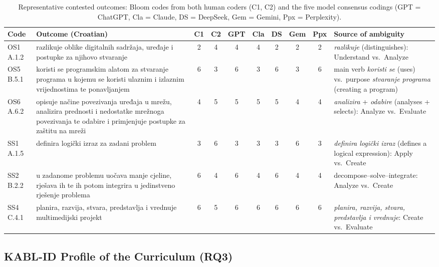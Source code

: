 \documentclass[journal,article,submit,pdftex,moreauthors]{Definitions/mdpi}
\begin{document}
\begin{table}[H]
\caption{Representative contested outcomes: Bloom codes from both human coders (C1, C2) and the five model consensus codings (GPT = ChatGPT, Cla = Claude, DS = DeepSeek, Gem = Gemini, Ppx = Perplexity).}
\label{tab:contested}
\centering
\scriptsize
\setlength{\tabcolsep}{2.5pt}
\begin{tabularx}{\linewidth}{lp{4.2cm}ccccccc>{\raggedright\arraybackslash}X}
\toprule
\textbf{Code} & \textbf{Outcome (Croatian)} & \textbf{C1} & \textbf{C2} & \textbf{GPT} & \textbf{Cla} & \textbf{DS} & \textbf{Gem} & \textbf{Ppx} & \textbf{Source of ambiguity} \\
\midrule
OS1 A.1.2 & razlikuje oblike digitalnih sadržaja, uređaje i postupke za njihovo stvaranje & 2 & 4 & 4 & 4 & 2 & 2 & 2 & \emph{razlikuje} (distinguishes): Understand vs.\ Analyze \\
\midrule
OS5 B.5.1 & koristi se programskim alatom za stvaranje programa u kojemu se koristi ulaznim i izlaznim vrijednostima te ponavljanjem & 6 & 3 & 6 & 3 & 6 & 3 & 6 & main verb \emph{koristi se} (uses) vs.\ purpose \emph{stvaranje programa} (creating a program) \\
\midrule
OS6 A.6.2 & opisuje načine povezivanja uređaja u mrežu, analizira prednosti i nedostatke mrežnoga povezivanja te odabire i primjenjuje postupke za zaštitu na mreži & 4 & 5 & 5 & 5 & 5 & 4 & 4 & \emph{analizira} + \emph{odabire} (analyses + selects): Analyze vs.\ Evaluate \\
\midrule
SS1 A.1.5 & definira logički izraz za zadani problem & 3 & 6 & 3 & 3 & 3 & 6 & 3 & \emph{definira logički izraz} (defines a logical expression): Apply vs.\ Create \\
\midrule
SS2 B.2.2 & u zadanome problemu uočava manje cjeline, rješava ih te ih potom integrira u jedinstveno rješenje problema & 6 & 4 & 6 & 4 & 6 & 4 & 4 & decompose--solve--integrate: Analyze vs.\ Create \\
\midrule
SS4 C.4.1 & planira, razvija, stvara, predstavlja i vrednuje multimedijski projekt & 6 & 5 & 6 & 6 & 6 & 6 & 6 & \emph{planira, razvija, stvara, predstavlja i vrednuje}: Create vs.\ Evaluate \\
\bottomrule
\end{tabularx}
\end{table}

\subsection{KABL-ID Profile of the Curriculum (RQ3)}
\label{sec:res_profile}
\end{document}
